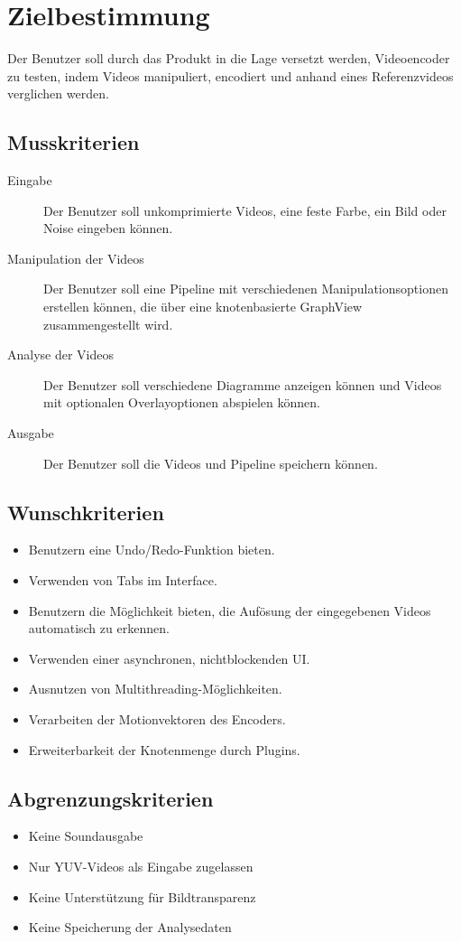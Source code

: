 \renewcommand{\labelitemi}{$-$}
\section{Zielbestimmung}

Der Benutzer soll durch das Produkt in die Lage versetzt werden, Videoencoder zu testen, indem Videos manipuliert, encodiert und anhand eines Referenzvideos verglichen werden.

\subsection{Musskriterien}

\begin{description}
	\item[Eingabe] Der Benutzer soll unkomprimierte Videos, eine feste Farbe, ein Bild oder Noise eingeben können.
	\item[Manipulation der Videos] Der Benutzer soll eine Pipeline mit verschiedenen Manipulationsoptionen erstellen können, die über eine knotenbasierte GraphView zusammengestellt wird.
	\item[Analyse der Videos] Der Benutzer soll verschiedene Diagramme anzeigen können und Videos mit optionalen Overlayoptionen abspielen können.
	\item[Ausgabe] Der Benutzer soll die Videos und Pipeline speichern können.
\end{description}

\subsection{Wunschkriterien}

\begin{itemize}
	\item Benutzern eine Undo/Redo-Funktion bieten.
	\item Verwenden von Tabs im Interface.
	\item Benutzern die Möglichkeit bieten, die Aufösung der eingegebenen Videos automatisch zu erkennen.
	\item Verwenden einer asynchronen, nichtblockenden UI.
	\item Ausnutzen von Multithreading-Möglichkeiten.
	\item Verarbeiten der Motionvektoren des Encoders.
	\item Erweiterbarkeit der Knotenmenge durch Plugins.
\end{itemize}

\subsection{Abgrenzungskriterien}

\begin{itemize}
	\item Keine Soundausgabe
	\item Nur YUV-Videos als Eingabe zugelassen
    \item Keine Unterstützung für Bildtransparenz
	\item Keine Speicherung der Analysedaten
\end{itemize}
